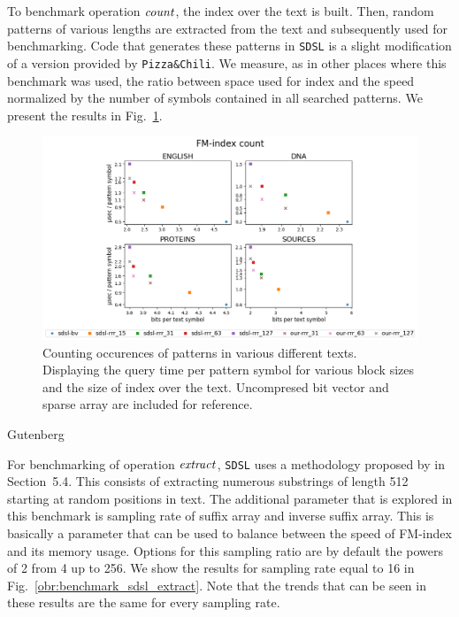 To benchmark operation $\mathit{count}$, the index over the text is built. Then, random patterns of
various lengths are extracted from the text and subsequently used for benchmarking. Code
that generates these patterns in \texttt{SDSL} is a slight modification of a version provided
by \texttt{Pizza\&Chili}. We measure, as in other places where this benchmark was used, the
ratio between space used for index and the speed normalized by the number of symbols contained
in all searched patterns. We present the results in Fig.~\ref{obr:benchmark_sdsl_count}.

\begin{figure}
	\centerline{
		\includegraphics[width=\textwidth, height=0.4\textheight]{images/vysledky_sdsl_count}
	}
	\caption[TODO]{Counting occurences of patterns in various different texts. Displaying
	the query time per pattern symbol for various block sizes and the size of index over the
	text. Uncompresed bit vector and sparse array are included for reference. 
	}
	\label{obr:benchmark_sdsl_count}
\end{figure}Gutenberg

For benchmarking of operation $\mathit{extract}$, \texttt{SDSL} uses a methodology proposed by
\cite{ferragina2009compressed} in Section~5.4. This consists of extracting numerous
substrings of length 512 starting at random positions in text. The additional parameter
that is explored in this benchmark is sampling rate of suffix array and inverse suffix array.
This is basically a parameter that can be used to balance between the speed of FM-index and
its memory usage. Options for this sampling ratio are by default the powers of 2 from 4 up to
256. We show the results for sampling rate equal to 16 in Fig.~\ref{obr:benchmark_sdsl_extract}.
Note that the trends that can be seen in these results are the same for every sampling rate.

